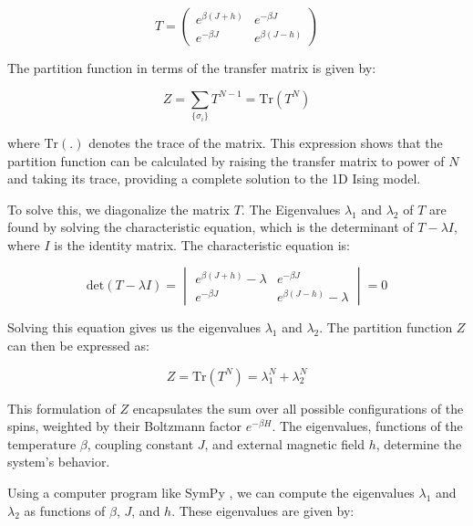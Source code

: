\begin{equation}
  \label{eq:transfer1d}
  T = \begin{pmatrix}
    e^{\beta(J+h)} & e^{-\beta J} \\
    e^{-\beta J} & e^{\beta(J-h)}
  \end{pmatrix}
\end{equation}

The partition function in terms of the transfer matrix is given by:

\begin{equation}
  \label{eq:partition1dmat2}
  Z = \sum_{\{\sigma_i\}} T^{N-1} = \text{Tr}(T^N)
\end{equation}

where \( \text{Tr}( . ) \) denotes the trace of the matrix. This expression shows
that the partition function can be calculated by raising the transfer matrix to
power of \( N \) and taking its trace, providing a complete solution to the 1D
Ising model.

To solve this, we diagonalize the matrix \( T \). The Eigenvalues \( \lambda_1
\) and \( \lambda_2 \) of \( T \) are found by solving the characteristic
equation, which is the determinant of \( T - \lambda I \), where \( I \) is the
identity matrix. The characteristic equation is:

\begin{equation}
\text{det}(T - \lambda I) = \begin{vmatrix}
    e^{\beta(J+h)} - \lambda & e^{-\beta J} \\
    e^{-\beta J} & e^{\beta(J-h)} - \lambda
\end{vmatrix} = 0
\end{equation}

Solving this equation gives us the eigenvalues \( \lambda_1 \) and \( \lambda_2
\). The partition function \( Z \) can then be expressed as:

\begin{equation}
Z = \text{Tr}(T^N) = \lambda_1^N + \lambda_2^N
\end{equation}

This formulation of \( Z \) encapsulates the sum over all possible
configurations of the spins, weighted by their Boltzmann factor \( e^{-\beta H}
\). The eigenvalues, functions of the temperature \( \beta \), coupling constant
\( J \), and external magnetic field \( h \), determine the system's behavior.

Using a computer program like SymPy \cite{SymPy}, we can compute the eigenvalues
\( \lambda_1 \) and \( \lambda_2 \) as functions of \( \beta \), \( J \), and \(
h \). These eigenvalues are given by:

